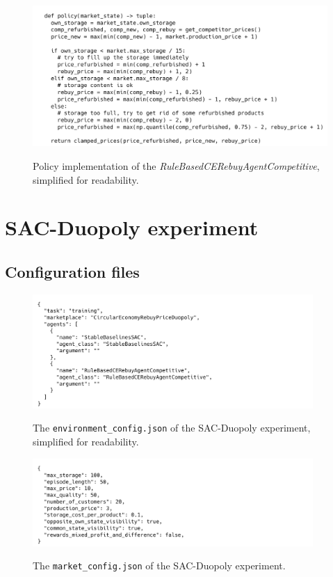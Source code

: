 \begin{figure}[ht]
	\includegraphics[width = \textwidth]{images/policies/RuleBasedCERebuyAgentCompetitivePolicy.png}\\
	\caption{Policy implementation of the \emph{RuleBasedCERebuyAgentCompetitive}, simplified for readability.}\label{fig:PolicyRuleBasedCompetitive}
\end{figure}

\clearpage
\section{SAC-Duopoly experiment}\label{sec:AppendixSACDuopoly}

\subsection{Configuration files}\label{subsec:AppendixSACDuopolyConfigFiles}

\begin{figure}[ht]
	\includegraphics[width = 0.95\textwidth]{images/configs/SACDuopoly/SACDuopolyEnvironment.png}\\
	\caption{The \texttt{environment\_config.json} of the SAC-Duopoly experiment, simplified for readability.}\label{fig:SACDuopolyConfigEnvironment}
\end{figure}

\begin{figure}[ht]
	\includegraphics[width = 0.95\textwidth]{images/configs/SACDuopoly/SACDuopolyMarket.png}\\
	\caption{The \texttt{market\_config.json} of the SAC-Duopoly experiment.}\label{fig:SACDuopolyConfigMarket}
\end{figure}

